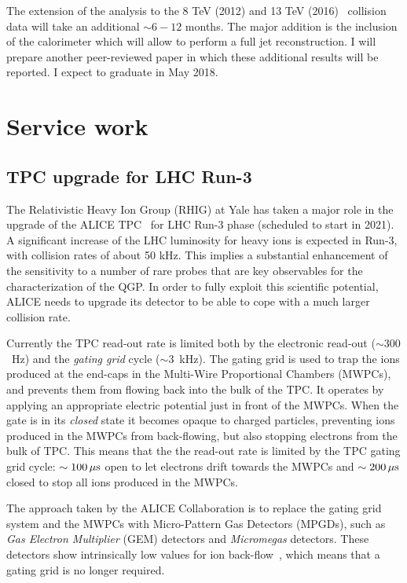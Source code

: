 \documentclass[12pt, a4paper, twoside, titlepage]{article}
\begin{document}
The extension of the analysis to the 8 TeV (2012) and 13 TeV (2016) \pp\ collision data will take an additional $\sim 6-12$ months. The major addition is the inclusion of the calorimeter
which will allow to perform a full jet reconstruction.
I will prepare another peer-reviewed paper in which these additional results will be reported.
I expect to graduate in May 2018.

\section{Service work}
\label{sect:ServiceWork}

\subsection{TPC upgrade for LHC Run-3}
The Relativistic Heavy Ion Group (RHIG) at Yale has taken a major role in the upgrade of the ALICE TPC~\cite{ALICE:2014c} for LHC Run-3 phase (scheduled to start in 2021).
A significant increase of the LHC luminosity for heavy ions is expected in Run-3, with collision rates of about 50 kHz. This implies a substantial enhancement
of the sensitivity to a number of rare probes that are key observables for the characterization of the QGP. In order to fully exploit this scientific potential, ALICE needs to
upgrade its detector to be able to cope with a much larger collision rate.

Currently the TPC read-out rate is limited both by the electronic read-out ($\sim 300$~Hz) and the \emph{gating grid} cycle ($\sim 3$~kHz).
The gating grid is used to trap the ions produced at the end-caps in the Multi-Wire Proportional Chambers (MWPCs), and prevents them from flowing back into the bulk of the TPC.
It operates by applying an appropriate electric potential just in front of the MWPCs. When the gate is in its \emph{closed} state
it becomes opaque to charged particles, preventing ions produced in the MWPCs from back-flowing, but also stopping
electrons from the bulk of TPC. This means that the the read-out rate is limited by the TPC gating grid cycle: $\sim 100\, \rm \mu s$
open to let electrons drift towards the MWPCs and $\sim 200\, \rm \mu s$ closed to stop all ions produced in the MWPCs.

The approach taken by the ALICE Collaboration is to replace the gating grid system and the MWPCs with Micro-Pattern Gas Detectors (MPGDs),
such as \emph{Gas Electron Multiplier} (GEM) detectors and \emph{Micromegas} detectors. These detectors show intrinsically low values for ion back-flow~\cite{Colas:2004,Sauli:2006},
which means that a gating grid is no longer required.
\end{document}
